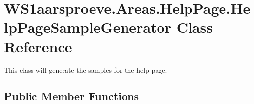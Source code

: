\hypertarget{class_w_s1aarsproeve_1_1_areas_1_1_help_page_1_1_help_page_sample_generator}{}\section{W\+S1aarsproeve.\+Areas.\+Help\+Page.\+Help\+Page\+Sample\+Generator Class Reference}
\label{class_w_s1aarsproeve_1_1_areas_1_1_help_page_1_1_help_page_sample_generator}


This class will generate the samples for the help page.  


\subsection*{Public Member Functions}
